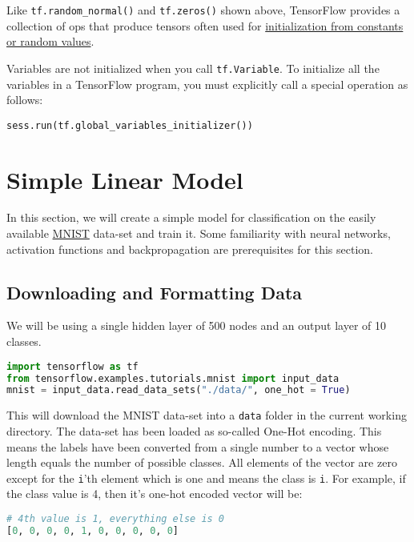 \documentclass[Proceedings]{ascelike}
\begin{document}
Like \texttt{tf.random\_normal()} and \texttt{tf.zeros()} shown above, TensorFlow provides a collection of ops that produce tensors often used for \href{https://www.tensorflow.org/versions/r1.0/api_guides/python/constant_op}{initialization from constants or random values}.

Variables are not initialized when you call \texttt{tf.Variable}. To initialize all the variables in a TensorFlow program, you must explicitly call a special operation as follows:

\begin{lstlisting}
sess.run(tf.global_variables_initializer())
\end{lstlisting}

\section{Simple Linear Model}
In this section, we will create a simple model for classification on the easily available \href{https://en.wikipedia.org/wiki/MNIST_database}{MNIST} data-set and train it. Some familiarity with neural networks, activation functions and backpropagation are prerequisites for this section.

\subsection{Downloading and Formatting Data}
We will be using a single hidden layer of 500 nodes and an output layer of 10 classes.

\begin{lstlisting}[language=Python]
import tensorflow as tf
from tensorflow.examples.tutorials.mnist import input_data
mnist = input_data.read_data_sets("./data/", one_hot = True)
\end{lstlisting}

This will download the MNIST data-set into a \texttt{data} folder in the current working directory. The data-set has been loaded as so-called One-Hot encoding. This means the labels have been converted from a single number to a vector whose length equals the number of possible classes. All elements of the vector are zero except for the \texttt{i}'th element which is one and means the class is \texttt{i}.
For example, if the class value is 4, then it's one-hot encoded vector will be:

\begin{lstlisting}[language=Python]
# 4th value is 1, everything else is 0
[0, 0, 0, 0, 1, 0, 0, 0, 0, 0]
\end{lstlisting}
\end{document}
